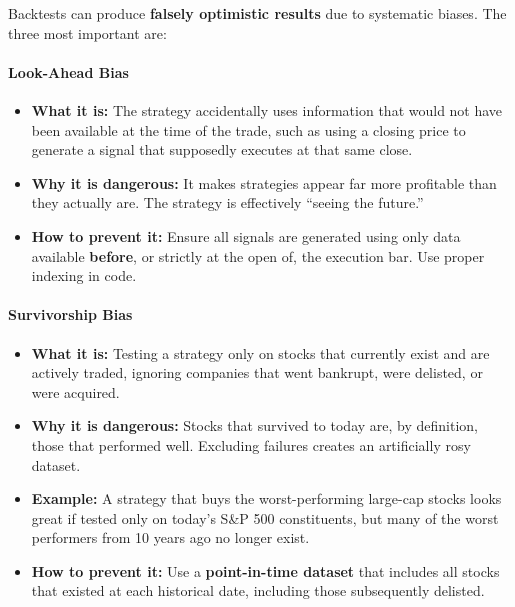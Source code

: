 \documentclass[12pt,openany]{book}
\begin{document}
Backtests can produce \textbf{falsely optimistic results} due to systematic biases. The three most important are:

\paragraph{Look-Ahead Bias}
\begin{itemize}[leftmargin=*]
    \item \textbf{What it is:} The strategy accidentally uses information that would not have been available at the time of the trade, such as using a closing price to generate a signal that supposedly executes at that same close.
    \item \textbf{Why it is dangerous:} It makes strategies appear far more profitable than they actually are. The strategy is effectively ``seeing the future.''
    \item \textbf{How to prevent it:} Ensure all signals are generated using only data available \textbf{before}, or strictly at the open of, the execution bar. Use proper indexing in code.
\end{itemize}

\paragraph{Survivorship Bias}
\begin{itemize}[leftmargin=*]
    \item \textbf{What it is:} Testing a strategy only on stocks that currently exist and are actively traded, ignoring companies that went bankrupt, were delisted, or were acquired.
    \item \textbf{Why it is dangerous:} Stocks that survived to today are, by definition, those that performed well. Excluding failures creates an artificially rosy dataset.
    \item \textbf{Example:} A strategy that buys the worst-performing large-cap stocks looks great if tested only on today's S\&P 500 constituents, but many of the worst performers from 10 years ago no longer exist.
    \item \textbf{How to prevent it:} Use a \textbf{point-in-time dataset} that includes all stocks that existed at each historical date, including those subsequently delisted.
\end{itemize}
\end{document}
